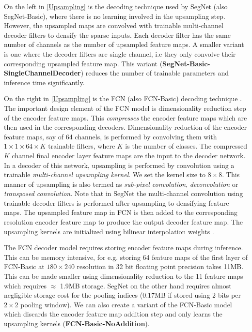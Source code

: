 On the left in \cref{Upsampling} is the decoding technique used by SegNet (also SegNet-Basic), where there is no learning involved in the upsampling step. However, the upsampled maps are convolved with trainable multi-channel decoder filters to densify the sparse inputs. Each decoder filter has the same number of channels as the number of upsampled feature maps. A smaller variant is one where the decoder filters are single channel, i.e they only convolve their corresponding upsampled feature map. This variant (\textbf{SegNet-Basic-SingleChannelDecoder}) reduces the number of trainable parameters and inference time significantly.

On the right in \cref{Upsampling} is the FCN (also FCN-Basic) decoding technique \citep{long2015fully}. The important design element of the FCN model is dimensionality reduction step of the encoder feature maps. This \textit{compresses} the encoder feature maps which are then used in the corresponding decoders. Dimensionality reduction of the encoder feature maps, say of 64 channels, is performed by convolving them with $1\times 1\times 64\times K$ trainable filters, where $K$ is the number of classes. The compressed $K$ channel final encoder layer feature maps are the input to the decoder network. In a decoder of this network, upsampling is performed by convolution using a trainable \textit{multi-channel upsampling kernel}. We set the kernel size to $8\times8$. This manner of upsampling is also termed as \textit{sub-pixel convolution}, \textit{deconvolution} or \textit{transposed convolution}. Note that in SegNet the multi-channel convolution using trainable decoder filters is performed after upsampling to densifying feature maps. The upsampled feature map in FCN is then added to the corresponding resolution encoder feature map to produce the output decoder feature map. The upsampling kernels are initialized using bilinear interpolation weights \citep{long2015fully}. 

The FCN decoder model requires storing encoder feature maps during inference. This can be memory intensive, for e.g. storing 64 feature maps of the first layer of FCN-Basic at $180\times240$ resolution in 32 bit floating point precision takes 11MB. This can be made smaller using dimensionality reduction to the 11 feature maps which requires $\approx$ 1.9MB storage. SegNet on the other hand requires almost negligible storage cost for the pooling indices ($0.17$MB if stored using 2 bits per $2\times2$ pooling window). We can also create a variant of the FCN-Basic model which discards the encoder feature map addition step and only learns the upsampling kernels (\textbf{FCN-Basic-NoAddition}). 

